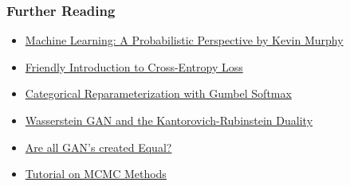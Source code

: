 \documentclass{beamer}
\begin{document}
\begin{frame}
  \frametitle{Further Reading}
  \begin{itemize}
    \item \href{http://www.amazon.com/Machine-Learning-Probabilistic-Perspective-Computation/dp/0262018020/ref=sr_1_2?ie=UTF8\&qid=1336857747\&sr=8-2}{Machine Learning: A Probabilistic Perspective by Kevin Murphy}
    \item \href{http://rdipietro.github.io/friendly-intro-to-cross-entropy-loss/}{Friendly Introduction to Cross-Entropy Loss}
    \item \href{https://arxiv.org/pdf/1611.01144.pdf}{Categorical Reparameterization with Gumbel Softmax}
    \item \href{https://vincentherrmann.github.io/blog/wasserstein/}{Wasserstein GAN and the Kantorovich-Rubinstein Duality}
    \item \href{https://arxiv.org/pdf/1711.10337.pdf}{Are all GAN's created Equal?}
    \item \href{http://arogozhnikov.github.io/2016/12/19/markov_chain_monte_carlo.html}{Tutorial on MCMC Methods}
  \end{itemize}
\end{frame}
\end{document}
